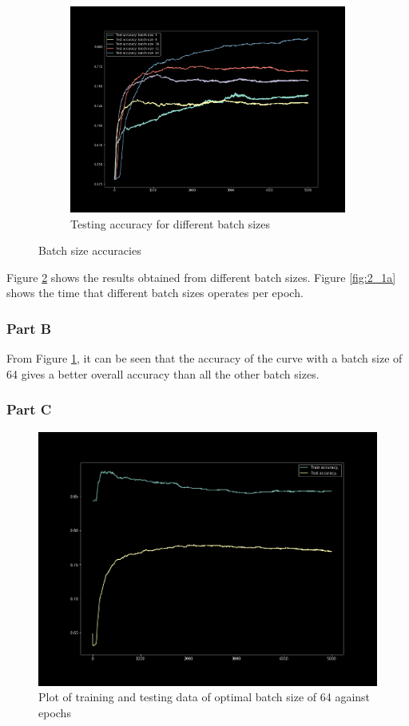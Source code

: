 \begin{figure}[H]
    \ContinuedFloat
    \begin{subfigure}{1\textwidth}
        \centering
        \includegraphics[width=0.8\linewidth]{assets/plots/part1_Q2a_3.png}
        \caption{Testing accuracy for different batch sizes}
        \label{fig:test_batch}
    \end{subfigure}
\caption{Batch size accuracies}
\label{fig:2a}
\end{figure}

Figure \ref{fig:2a} shows the results obtained from different batch sizes. Figure \ref{fig:2_1a} shows the time that different batch sizes operates per epoch.

\subsubsection{Part B}
From Figure \ref{fig:test_batch}, it can be seen that the accuracy of the curve with a batch size of 64 gives a better overall accuracy than all the other batch sizes.

\subsubsection{Part C}

\begin{figure}[H]
    \centering
    \includegraphics[width=0.8\linewidth]{assets/plots/part1_Q1a.png}
    \caption{Plot of training and testing data of optimal batch size of 64 against epochs}
    \label{fig:2c}
\end{figure}

